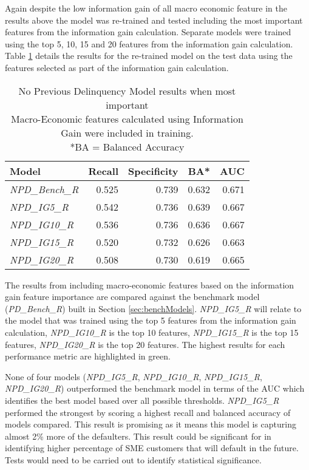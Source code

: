 Again despite the low information gain of all macro economic feature in the results above the model was re-trained and tested including the most important features from the information gain calculation. Separate models were trained using the top 5, 10, 15 and 20 features from the information gain calculation. Table \ref{table:InfoGainNPDModelResults} details the results for the re-trained model on the test data using the features selected as part of the information gain calculation.


\begin{table}[H]
\centering
\small
		\begin{tabular}{l r r r r}
			\hline
			\textbf{Model} & \textbf{Recall} & \textbf{Specificity} & \textbf{BA*} & \textbf{AUC}  \\ \hline
			\textit{NPD\_Bench\_R} & 0.525 & \cellcolor{green!25}0.739 & 0.632 & \cellcolor{green!25}0.671   \\ \hline
			\textit{NPD\_IG5\_R} & \cellcolor{green!25}0.542 & 0.736 & \cellcolor{green!25}0.639 & 0.667   \\ 
			\textit{NPD\_IG10\_R} & 0.536 & 0.736 & 0.636 & 0.667  \\ 
			\textit{NPD\_IG15\_R} & 0.520 & 0.732 & 0.626 & 0.663 \\
			\textit{NPD\_IG20\_R} &  0.508 & 0.730 & 0.619 & 0.665  \\\hline 
		\end{tabular}
	\caption{No Previous Delinquency Model results when most important \\Macro-Economic features calculated using Information Gain were included in training.\\
		*BA = Balanced Accuracy}
	\label{table:InfoGainNPDModelResults}
\end{table}

The results from including macro-economic features based on the information gain feature importance are compared against the benchmark model (\textit{PD\_Bench\_R}) built in Section \ref{sec:benchModels}. \textit{NPD\_IG5\_R} will relate to the model that was trained using the top 5 features from the information gain calculation, \textit{NPD\_IG10\_R} is the top 10 features, \textit{NPD\_IG15\_R} is the top 15 features, \textit{NPD\_IG20\_R} is the top 20 features. The highest results for each performance metric are highlighted in green.

None of four models (\textit{NPD\_IG5\_R}, \textit{NPD\_IG10\_R}, \textit{NPD\_IG15\_R}, \textit{NPD\_IG20\_R}) outperformed the benchmark model in terms of the AUC which identifies the best model based over all possible thresholds. \textit{NPD\_IG5\_R} performed the strongest by scoring a highest recall and balanced accuracy of models compared. This result is promising as it means this model is capturing almost 2\% more of the defaulters. This result could be significant for in identifying higher percentage of SME customers that will default in the future. Tests would need to be carried out to identify statistical significance.


